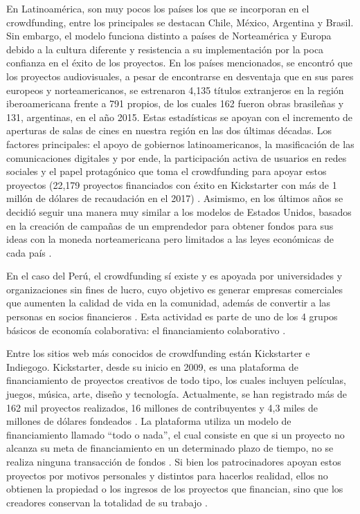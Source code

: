 En Latinoamérica, son muy pocos los países los que se incorporan en el crowdfunding, entre los principales se destacan Chile, México, Argentina y Brasil. Sin embargo, el modelo funciona distinto a países de Norteamérica y Europa debido a la cultura diferente y resistencia a su implementación por la poca confianza en el éxito de los proyectos. En los países mencionados, se encontró que los proyectos audiovisuales, a pesar de encontrarse en desventaja que en sus pares europeos y norteamericanos, se estrenaron 4,135 títulos extranjeros en la región iberoamericana frente a 791 propios, de los cuales 162 fueron obras brasileñas y 131, argentinas, en el año 2015. Estas estadísticas se apoyan con el incremento de aperturas de salas de cines en nuestra región en las dos últimas décadas. Los factores principales: el apoyo de gobiernos latinoamericanos, la masificación de las comunicaciones digitales y por ende, la participación activa de usuarios en redes sociales y el papel protagónico que toma el crowdfunding para apoyar estos proyectos (22,179 proyectos financiados con éxito en Kickstarter con más de 1 millón de dólares de recaudación en el 2017) \parencite{cr_lopezgolan2017crowdfunding}. Asimismo, en los últimos años se decidió seguir una manera muy similar a los modelos de Estados Unidos, basados en la creación de campañas de un emprendedor para obtener fondos para sus ideas con la moneda norteamericana pero limitados a las leyes económicas de cada país \parencite{cr_sl_crowdfundlatam}.


En el caso del Perú, el crowdfunding sí existe y es apoyada por universidades y organizaciones sin fines de lucro, cuyo objetivo es generar empresas comerciales que aumenten la calidad de vida en la comunidad, además de convertir a las personas en socios financieros \parencite{cr_fernandezbedoya2020colecoperu}. Esta actividad es parte de uno de los 4 grupos básicos de economía colaborativa: el financiamiento colaborativo \parencite{cr_stokes2014coleco}.

Entre los sitios web más conocidos de crowdfunding están Kickstarter e Indiegogo. Kickstarter, desde su inicio en 2009, es una plataforma de financiamiento de proyectos creativos de todo tipo, los cuales incluyen películas, juegos, música, arte, diseño y tecnología. Actualmente, se han registrado más de 162 mil proyectos realizados, 16 millones de contribuyentes y 4,3 miles de millones de dólares fondeados \parencite{cr_kickstarter_about}. La plataforma utiliza un modelo de financiamiento llamado “todo o nada”, el cual consiste en que si un proyecto no alcanza su meta de financiamiento en un determinado plazo de tiempo, no se realiza ninguna transacción de fondos \parencite{cr_kickstarter_founding}. Si bien los patrocinadores apoyan estos proyectos por motivos personales y distintos para hacerlos realidad, ellos no obtienen la propiedad o los ingresos de los proyectos que financian, sino que los creadores conservan la totalidad de su trabajo \parencite{cr_kickstarter_press}.

